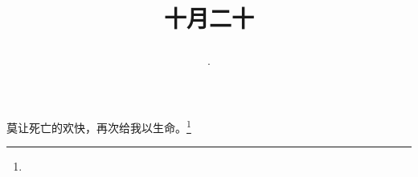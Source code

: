 \title{\date[d=20,m=11,y=2024][year:cn-y,年,month:cn,day:cn,日,·,weekday]·十月二十 }
莫让死亡的欢快，再次给我以生命。\footnote{ }

